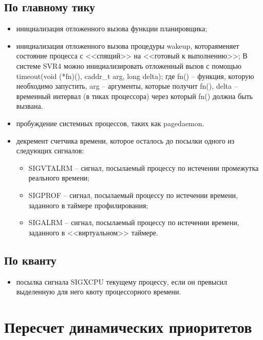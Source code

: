 \subsection*{По главному тику}

\begin{itemize}
	\item инициализация отложенного вызова функции планировщика;
	\item инициализация отложенного вызова процедуры wakeup, котораяменяет состояние процесса с <<спящий>> на <<готовый к выполнению>>;
	В системе SVR4 можно инициализировать отложенный вызов с помощью timeout(void (*fn)(), caddr\_t arg, long delta); где fn() -- функция, которую необходимо запустить, arg -- аргументы, которые получит fn(), delta -- временный интервал (в тиках процессора) через который fn() должна быть вызвана.
	
	\item пробуждение системных процессов, таких как pagedaemon.
	
	\item декремент счетчика времени, которое осталось до посылки одного из следующих сигналов:
	\begin{itemize}
		\item SIGVTALRM – сигнал, посылаемый процессу по истечении промежутка реального времени;
		\item SIGPROF – сигнал, посылаемый процессу по истечении времени, заданного в таймере профилирования;
		\item SIGALRM – сигнал, посылаемый процессу по истечении времени, заданного в <<виртуальном>> таймере.	
	\end{itemize}
\end{itemize}

\subsection*{По кванту}

\begin{itemize}
	\item посылка сигнала SIGXCPU текущему процессу, если он превысил выделенную для него квоту процессорного времени.
\end{itemize}

\clearpage



\section*{Пересчет динамических приоритетов}

